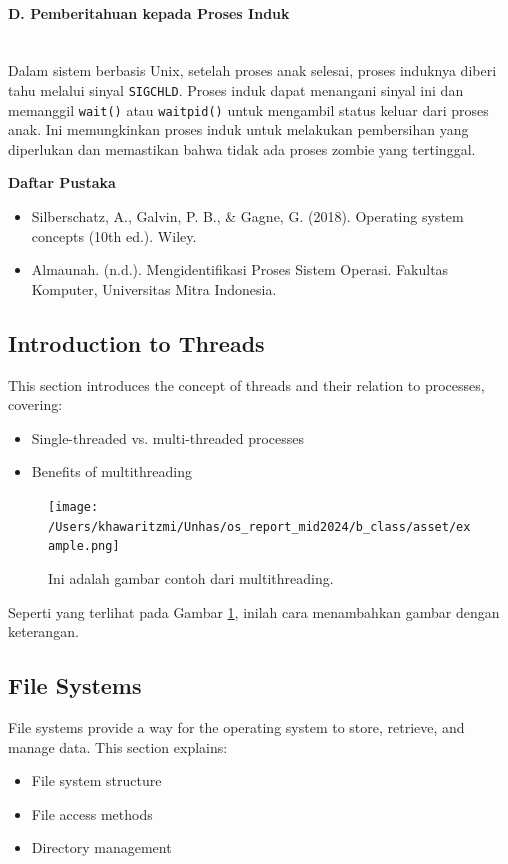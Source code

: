 \documentclass[12pt]{article}
\begin{document}
\begin{itemize}
    \paragraph{D. Pemberitahuan kepada Proses Induk}\mbox{} \\ 
    Dalam sistem berbasis Unix, setelah proses anak selesai, proses induknya diberi tahu melalui sinyal \texttt{SIGCHLD}. Proses induk dapat menangani sinyal ini dan memanggil \texttt{wait()} atau \texttt{waitpid()} untuk mengambil status keluar dari proses anak. Ini memungkinkan proses induk untuk melakukan pembersihan yang diperlukan dan memastikan bahwa tidak ada proses zombie yang tertinggal.

    \textbf{Daftar Pustaka}
    \begin{itemize}
        \item Silberschatz, A., Galvin, P. B., & Gagne, G. (2018). Operating system concepts (10th ed.). Wiley.
        \item Almaunah. (n.d.). Mengidentifikasi Proses Sistem Operasi. Fakultas Komputer, Universitas Mitra Indonesia.
    \end{itemize}
\end{itemize}

\subsection{Introduction to Threads}
This section introduces the concept of threads and their relation to processes, covering:
\begin{itemize}
    \item Single-threaded vs. multi-threaded processes
    \item Benefits of multithreading
\end{itemize}

\begin{figure}[h]
    \centering
    \texttt{[image: /Users/khawaritzmi/Unhas/os\_report\_mid2024/b\_class/asset/example.png]}  %
    \caption{Ini adalah gambar contoh dari multithreading.}
    \label{fig:contoh_gambar}
\end{figure}

Seperti yang terlihat pada Gambar \ref{fig:contoh_gambar}, inilah cara menambahkan gambar dengan keterangan.

\subsection{File Systems}
File systems provide a way for the operating system to store, retrieve, and manage data. This section explains:
\begin{itemize}
    \item File system structure
    \item File access methods
    \item Directory management
\end{itemize}
\end{document}
